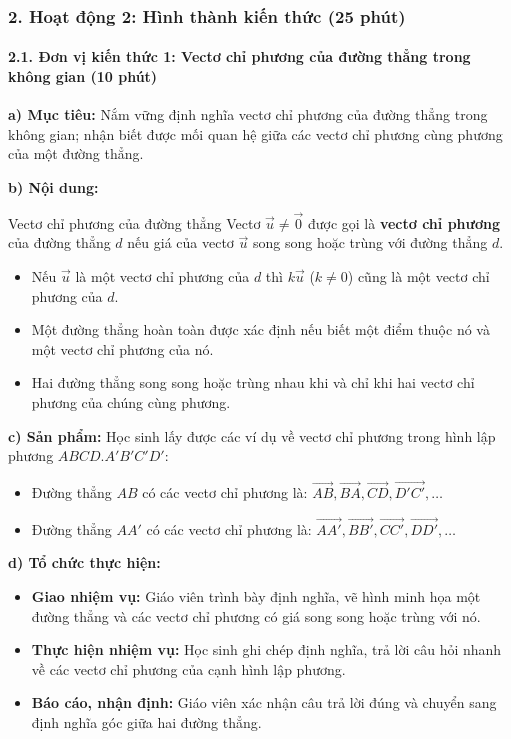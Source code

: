 \documentclass[12pt, a4paper]{article}
\renewcommand{\vec}[1]{\overrightarrow{#1}}
\begin{document}
\subsubsection*{2. Hoạt động 2: Hình thành kiến thức (25 phút)}

\paragraph{2.1. Đơn vị kiến thức 1: Vectơ chỉ phương của đường thẳng trong không gian (10 phút)}

\noindent \textbf{a) Mục tiêu:}
Nắm vững định nghĩa vectơ chỉ phương của đường thẳng trong không gian; nhận biết được mối quan hệ giữa các vectơ chỉ phương cùng phương của một đường thẳng.

\noindent \textbf{b) Nội dung:}
\begin{pedabox}{Vectơ chỉ phương của đường thẳng}
Vectơ $\vec{u} \neq \vec{0}$ được gọi là \textbf{vectơ chỉ phương} của đường thẳng $d$ nếu giá của vectơ $\vec{u}$ song song hoặc trùng với đường thẳng $d$.
\begin{itemize}[leftmargin=0.6cm]
    \item Nếu $\vec{u}$ là một vectơ chỉ phương của $d$ thì $k\vec{u}$ ($k \neq 0$) cũng là một vectơ chỉ phương của $d$.
    \item Một đường thẳng hoàn toàn được xác định nếu biết một điểm thuộc nó và một vectơ chỉ phương của nó.
    \item Hai đường thẳng song song hoặc trùng nhau khi và chỉ khi hai vectơ chỉ phương của chúng cùng phương.
\end{itemize}
\end{pedabox}

\noindent \textbf{c) Sản phẩm:}
Học sinh lấy được các ví dụ về vectơ chỉ phương trong hình lập phương $ABCD.A'B'C'D'$:
\begin{itemize}
    \item Đường thẳng $AB$ có các vectơ chỉ phương là: $\vec{AB}, \vec{BA}, \vec{CD}, \vec{D'C'}, \dots$
    \item Đường thẳng $AA'$ có các vectơ chỉ phương là: $\vec{AA'}, \vec{BB'}, \vec{CC'}, \vec{DD'}, \dots$
\end{itemize}

\noindent \textbf{d) Tổ chức thực hiện:}
\begin{itemize}[leftmargin=0.6cm]
    \item \textbf{Giao nhiệm vụ:} Giáo viên trình bày định nghĩa, vẽ hình minh họa một đường thẳng và các vectơ chỉ phương có giá song song hoặc trùng với nó.
    \item \textbf{Thực hiện nhiệm vụ:} Học sinh ghi chép định nghĩa, trả lời câu hỏi nhanh về các vectơ chỉ phương của cạnh hình lập phương.
    \item \textbf{Báo cáo, nhận định:} Giáo viên xác nhận câu trả lời đúng và chuyển sang định nghĩa góc giữa hai đường thẳng.
\end{itemize}
\end{document}
